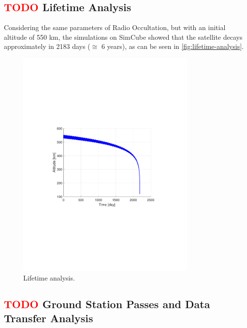 
\subsection{ \textcolor{red}{TODO} Lifetime Analysis}

Considering the same parameters of Radio Occultation, but with an initial altitude of 550 km, the simulations on SimCube showed that the satellite decays approximately in 2183 days ($\cong$ 6 years), as can be seen in \autoref{fig:lifetime-analysis}.

\begin{figure}[!ht]
    \begin{center}
        \includegraphics[trim=3.5cm 8cm 4.0cm 8cm,clip, width=0.8\textwidth]{curves/Altitude.pdf}
        \caption{Lifetime analysis.}
        \label{fig:lifetime-analysis}
    \end{center}
\end{figure}

\subsection{ \textcolor{red}{TODO} Ground Station Passes and Data Transfer Analysis}

